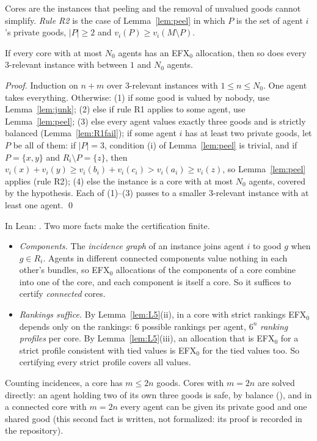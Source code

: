 \documentclass[runningheads,11pt]{llncs}
\newcommand{\efxz}{\texorpdfstring{\mbox{EFX$_0$}}{EFX0}}
\begin{document}
\noindent Cores are the instances that peeling and the removal of unvalued goods cannot simplify. \emph{Rule R2} is the case of Lemma~\ref{lem:peel} in which $P$ is the set of agent $i$'s private goods, $|P|\ge2$ and $v_i(P)\ge v_i(M\setminus P)$.

\begin{proposition}\label{prop:core}
If every core with at most $N_0$ agents has an \efxz{} allocation, then so does every $3$-relevant instance with between $1$ and $N_0$ agents.
\end{proposition}

\begin{proof}
Induction on $n+m$ over $3$-relevant instances with $1\le n\le N_0$. One agent takes everything. Otherwise:
(1) if some good is valued by nobody, use Lemma~\ref{lem:junk};
(2) else if rule R1 applies to some agent, use Lemma~\ref{lem:peel};
(3) else every agent values exactly three goods and is strictly balanced (Lemma~\ref{lem:R1fail}); if some agent $i$ has at least two private goods, let $P$ be all of them: if $|P|=3$, condition (i) of Lemma~\ref{lem:peel} is trivial, and if $P=\{x,y\}$ and $R_i\setminus P=\{z\}$, then $v_i(x)+v_i(y)\ge v_i(b_i)+v_i(c_i)>v_i(a_i)\ge v_i(z)$, so Lemma~\ref{lem:peel} applies (rule R2);
(4) else the instance is a core with at most $N_0$ agents, covered by the hypothesis.
Each of (1)--(3) passes to a smaller $3$-relevant instance with at least one agent. \qed
\end{proof}

\noindent In Lean: . Two more facts make the certification finite.
\begin{itemize}
\item \emph{Components.} The \emph{incidence graph} of an instance joins agent $i$ to good $g$ when $g\in R_i$. Agents in different connected components value nothing in each other's bundles, so \efxz{} allocations of the components of a core combine into one of the core, and each component is itself a core. So it suffices to certify \emph{connected} cores.
\item \emph{Rankings suffice.} By Lemma~\ref{lem:L5}(ii), in a core with strict rankings \efxz{} depends only on the rankings: $6$ possible rankings per agent, $6^n$ \emph{ranking profiles} per core. By Lemma~\ref{lem:L5}(iii), an allocation that is \efxz{} for a strict profile consistent with tied values is \efxz{} for the tied values too. So certifying every strict profile covers all values.
\end{itemize}
Counting incidences, a core has $m\le2n$ goods. Cores with $m=2n$ are solved directly: an agent holding two of its own three goods is safe, by balance (), and in a connected core with $m=2n$ every agent can be given its private good and one shared good (this second fact is written, not formalized: its proof is recorded in the repository).
\end{document}
